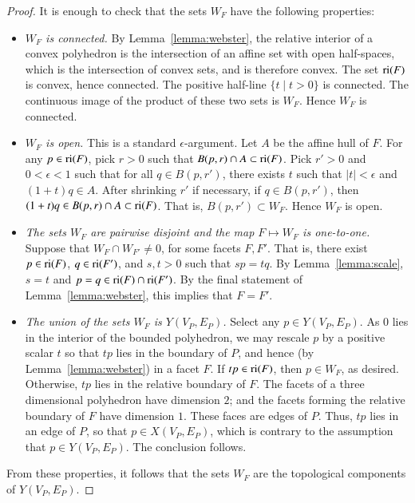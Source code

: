 \begin{proof} It is enough to check that the sets $W_F$ have the following properties:
\begin{itemize}
\item {\it $W_F$ is connected.} By Lemma~\ref{lemma:webster}, the relative interior of a convex polyhedron is the intersection of an affine set with open half-spaces, which is the intersection of convex sets, and is therefore convex. The set ${\operatorname{ri}}(F)$ is convex, hence connected.    The positive half-line $\{t\mid t>0\}$ is connected.  The continuous image of the product of these two sets is $W_F$.  Hence $W_F$ is connected.
\item {\it $W_F$ is  open.}  This is a standard $\epsilon$-argument.  Let $A$ be the affine hull of $F$.  For any $p\in {\operatorname{ri}}(F)$, pick $r>0$ such that $B(p,r)\cap A\subset {\operatorname{ri}}(F)$.  Pick $r'>0$ and $0<\epsilon<1$ such that for all $q\in B(p,r')$, there exists $t$ such that $|t|<\epsilon$ and $(1+t)q\in A$.  After shrinking $r'$ if necessary,  if $q\in B(p,r')$, then $(1+t)q \in B(p,r)\cap A \subset {\operatorname{ri}}(F)$.   That is, $B(p,r')\subset W_F$.  Hence $W_F$ is open.
\item {\it The sets $W_F$ are pairwise disjoint and the map $F\mapsto W_F$ is one-to-one.}  Suppose  that $W_F\cap W_{F'}\ne 0$, for some facets $F, F'$.  That is, there exist $p\in {\operatorname{ri}}(F)$, $q\in {\operatorname{ri}}(F')$, and $s,t>0$ such that
$s p = t q$.  By Lemma~\ref{lemma:scale}, $s=t$ and $p=q\in {\operatorname{ri}}(F)\cap {\operatorname{ri}}(F')$.  By the final statement of Lemma~\ref{lemma:webster}, this implies that $F=F'$.
\item {\it The union of the sets $W_F$ is $Y(V_P,E_P)$.}  Select any $p\in Y(V_P,E_P)$.  As $0$ lies in the interior of the bounded polyhedron, we may rescale $p$ by a positive scalar $t$ so that $t p$ lies in the boundary of $P$, and hence (by Lemma~\ref{lemma:webster}) in a facet $F$.  If $t p \in {\operatorname{ri}}(F)$, then $p\in W_F$, as desired.  Otherwise, $t p$ lies in the relative boundary of $F$.  The facets of a three dimensional polyhedron have dimension $2$; and the facets forming the relative boundary of $F$ have dimension $1$.  These faces are edges of $P$.  Thus, $t p$ lies in an edge of $P$, so that $p\in X(V_P,E_P)$, which is contrary to the assumption that $p\in Y(V_P,E_P)$.  The conclusion follows.
\end{itemize}
From these properties, it follows that the sets $W_F$ are the topological components of $Y(V_P,E_P)$.
\end{proof}


